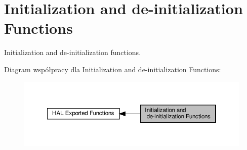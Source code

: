 \hypertarget{group___h_a_l___exported___functions___group1}{}\section{Initialization and de-\/initialization Functions}
\label{group___h_a_l___exported___functions___group1}


Initialization and de-\/initialization functions.  


Diagram współpracy dla Initialization and de-\/initialization Functions\+:\nopagebreak
\begin{figure}[H]
\begin{center}
\leavevmode
\includegraphics[width=350pt]{group___h_a_l___exported___functions___group1}
\end{center}
\end{figure}
